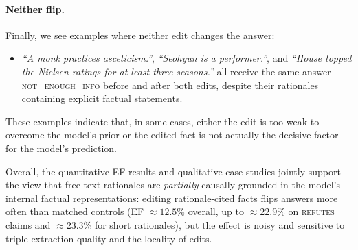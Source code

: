 \documentclass[11pt]{article}
\begin{document}
\paragraph{Neither flip.}
Finally, we see examples where neither edit changes the answer:
\begin{itemize}
  \item \emph{``A monk practices asceticism.''}, \emph{``Seohyun is a performer.''}, and \emph{``House topped the Nielsen ratings for at least three seasons.''} all receive the same answer \textsc{not\_enough\_info} before and after both edits, despite their rationales containing explicit factual statements.
\end{itemize}
These examples indicate that, in some cases, either the edit is too weak to overcome the model's prior or the edited fact is not actually the decisive factor for the model's prediction.

\medskip

Overall, the quantitative EF results and qualitative case studies jointly support the view that free-text rationales are \emph{partially} causally grounded in the model's internal factual representations: editing rationale-cited facts flips answers more often than matched controls (EF $\approx 12.5\%$ overall, up to $\approx 22.9\%$ on \textsc{refutes} claims and $\approx 23.3\%$ for short rationales), but the effect is noisy and sensitive to triple extraction quality and the locality of edits.
\end{document}
